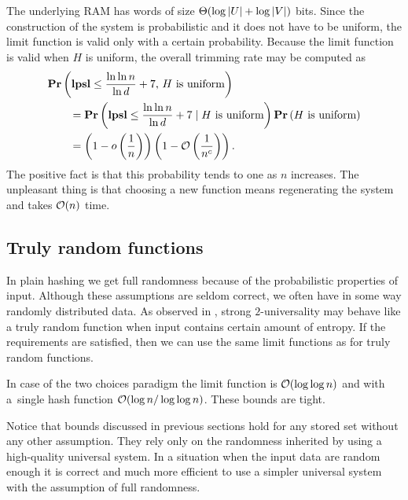 The underlying RAM has words of size $\mathrm{\Theta}(\log |U| + \log |V|)$ bits. Since the construction of the system is probabilistic and it does not have to be uniform, the limit function is valid only with a certain probability. Because the limit function is valid when $H$ is uniform, the overall trimming rate may be computed as
\[
\begin{split} 
& \mathbf{Pr}\left(\mathbf{lpsl} \leq \frac{\ln \ln n}{\ln d} + 7,\, H \mbox{ is uniform}\right) \\
	& \qquad = \mathbf{Pr}\left(\mathbf{lpsl} \leq \frac{\ln \ln n}{\ln d} + 7 \mid H \mbox{ is uniform}\right) \mathbf{Pr}\left(H \mbox{ is uniform}\right) \\ 
	& \qquad = \left(1 - o\left(\frac{1}{n}\right)\right)\left(1 - \mathcal{O}\left(\frac{1}{n^c}\right)\right). \\
\end{split}
\]
The positive fact is that this probability tends to one as $n$ increases. The unpleasant thing is that choosing a new function means regenerating the system and takes $\mathcal{O}(n)$ time.

\subsection{Truly random functions}
\label{subsection-truly-random-functions}
In plain hashing we get full randomness because of the probabilistic properties of input. Although these assumptions are seldom correct, we often have in some way randomly distributed data. As observed in \cite{DBLP:conf/soda/MitzenmacherV08}, strong $2$-universality may behave like a truly random function when input contains certain amount of entropy. If the requirements are satisfied, then we can use the same limit functions as for truly random functions.

In case of the two choices paradigm the limit function is $\mathcal{O}(\log \log n)$ and with a~single hash function $\mathcal{O}(\log n / \log \log n)$. These bounds are tight.

Notice that bounds discussed in previous sections hold for any stored set without any other assumption. They rely only on the randomness inherited by using a high-quality universal system. In a situation when the input data are random enough it is correct and much more efficient to use a simpler universal system with the assumption of full randomness.


